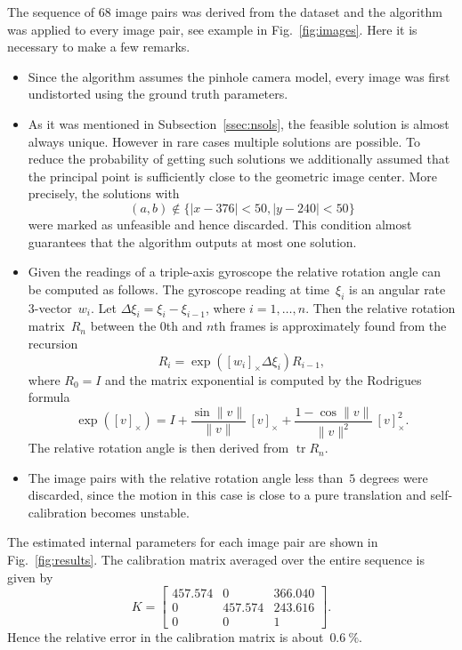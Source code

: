 \documentclass[reqno]{amsart}
\DeclareMathOperator{\tr}{tr}
\theoremstyle{plain}
\begin{document}
The sequence of 68 image pairs was derived from the dataset and the algorithm was applied to every image pair, see example in Fig.~\ref{fig:images}. Here it is necessary to make a few remarks.
\begin{itemize}
\item Since the algorithm assumes the pinhole camera model, every image was first undistorted using the ground truth parameters.

\item As it was mentioned in Subsection~\ref{ssec:nsols}, the feasible solution is almost always unique. However in rare cases multiple solutions are possible. To reduce the probability of getting such solutions we additionally assumed that the principal point is sufficiently close to the geometric image center. More precisely, the solutions with
\begin{equation}
(a, b) \not\in \{|x - 376| < 50, |y - 240| < 50\}
\end{equation}
were marked as unfeasible and hence discarded. This condition almost guarantees that the algorithm outputs at most one solution.

\item Given the readings of a triple-axis gyroscope the relative rotation angle can be computed as follows. The gyroscope reading at time~$\xi_i$ is an angular rate 3-vector~$w_i$. Let $\Delta \xi_i = \xi_i - \xi_{i - 1}$, where $i = 1, \ldots, n$. Then the relative rotation matrix~$R_n$ between the $0$th and $n$th frames is approximately found from the recursion
    \begin{equation}
    R_i = \exp([w_i]_\times \Delta \xi_i) R_{i - 1},
    \end{equation}
    where $R_0 = I$ and the matrix exponential is computed by the Rodrigues formula
    \begin{equation}
    \exp([v]_\times) = I + \frac{\sin\|v\|}{\|v\|}\, [v]_\times + \frac{1 - \cos\|v\|}{\|v\|^2}\, [v]^2_\times.
    \end{equation}
    The relative rotation angle is then derived from $\tr R_n$.

\item The image pairs with the relative rotation angle less than~$5$ degrees were discarded, since the motion in this case is close to a pure translation and self-calibration becomes unstable.
\end{itemize}

The estimated internal parameters for each image pair are shown in Fig.~\ref{fig:results}. The calibration matrix averaged over the entire sequence is given by
\begin{equation}
K = \begin{bmatrix}457.574 & 0 & 366.040 \\ 0 & 457.574 & 243.616 \\ 0 & 0 & 1 \end{bmatrix}.
\end{equation}
Hence the relative error in the calibration matrix is about~$0.6~\%$.
\end{document}
